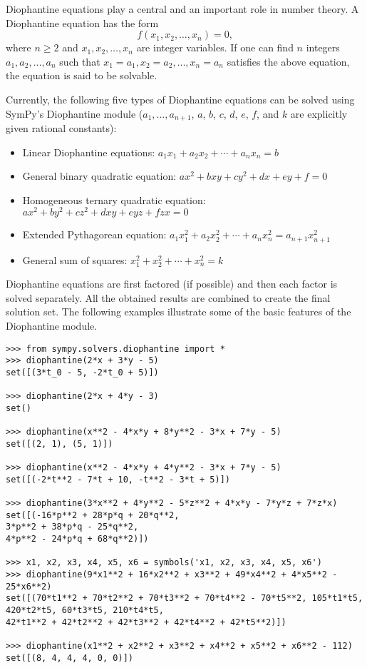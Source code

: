 Diophantine equations play a central and an important role in number theory.  A
Diophantine equation has the form \[f(x_1, x_2, \dotsc, x_n) = 0,\] where $n \geq
2$ and $x_1, x_2, \dotsc, x_n$ are integer variables. If one can find $n$
integers $a_1, a_2, \dotsc, a_n$ such that $x_1 = a_1, x_2 = a_2, \dotsc, x_n =
a_n$ satisfies the above equation, the equation is said to be solvable.

Currently, the following five types of Diophantine equations can be solved using
SymPy's Diophantine module ($a_1, \ldots, a_{n+1}$, $a$, $b$, $c$, $d$, $e$,
$f$, and $k$ are explicitly given rational constants):

\begin{itemize}
    \item Linear Diophantine equations: $a_1x_1 + a_2x_2 + \dotsb{} + a_{n}x_{n} = b$
    \item General binary quadratic equation: $ax^2 + bxy + cy^2 + dx + ey + f = 0$
    \item Homogeneous ternary quadratic equation: $ax^2 + by^2 + cz^2 + dxy + eyz + fzx = 0$
    \item Extended Pythagorean equation: $a_{1}x_{1}^2 + a_{2}x_{2}^2 + \dotsb{} + a_{n}x_{n}^2 = a_{n+1}x_{n+1}^2$
    \item General sum of squares: $x_{1}^2 + x_{2}^2 + \dotsb{} + x_{n}^2 = k$
\end{itemize}

Diophantine equations are first factored (if possible) and then each
factor is solved separately. All the obtained results are combined
to create the final solution set. The following examples illustrate some of the
basic features of the Diophantine module.

\begin{verbatim}
>>> from sympy.solvers.diophantine import *
>>> diophantine(2*x + 3*y - 5)
set([(3*t_0 - 5, -2*t_0 + 5)])

>>> diophantine(2*x + 4*y - 3)
set()

>>> diophantine(x**2 - 4*x*y + 8*y**2 - 3*x + 7*y - 5)
set([(2, 1), (5, 1)])

>>> diophantine(x**2 - 4*x*y + 4*y**2 - 3*x + 7*y - 5)
set([(-2*t**2 - 7*t + 10, -t**2 - 3*t + 5)])

>>> diophantine(3*x**2 + 4*y**2 - 5*z**2 + 4*x*y - 7*y*z + 7*z*x)
set([(-16*p**2 + 28*p*q + 20*q**2,
3*p**2 + 38*p*q - 25*q**2,
4*p**2 - 24*p*q + 68*q**2)])

>>> x1, x2, x3, x4, x5, x6 = symbols('x1, x2, x3, x4, x5, x6')
>>> diophantine(9*x1**2 + 16*x2**2 + x3**2 + 49*x4**2 + 4*x5**2 - 25*x6**2)
set([(70*t1**2 + 70*t2**2 + 70*t3**2 + 70*t4**2 - 70*t5**2, 105*t1*t5,
420*t2*t5, 60*t3*t5, 210*t4*t5,
42*t1**2 + 42*t2**2 + 42*t3**2 + 42*t4**2 + 42*t5**2)])

>>> diophantine(x1**2 + x2**2 + x3**2 + x4**2 + x5**2 + x6**2 - 112)
set([(8, 4, 4, 4, 0, 0)])
\end{verbatim}
